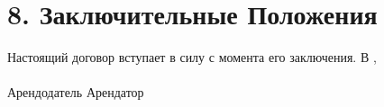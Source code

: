 \section*{8. Заключительные Положения}
Настоящий договор вступает в силу с момента его заключения. 
\vspace{2cm}
В \ContractPlace, \ \ContractDate \hfill \underline{\hspace{5cm}} \\ \vspace{1.5cm}
\underline{\hspace{5cm}} \hfill \underline{\hspace{5cm}} \\ \vspace{0.2cm} Арендодатель \hfill Арендатор \\
